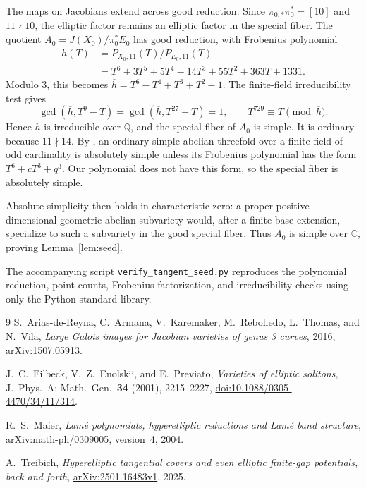 \documentclass[11pt]{amsart}
\theoremstyle{remark}
\newcommand{\Q}{\mathbb Q}
\newcommand{\CC}{\mathbb C}
\numberwithin{equation}{section}
\begin{document}
The maps on Jacobians extend across good reduction. Since
$\pi_{0,*}\pi_0^*=[10]$ and $11\nmid10$, the elliptic factor remains
an elliptic factor in the special fiber. The quotient
$A_0=J(X_0)/\pi_0^*E_0$ has good reduction, with Frobenius polynomial
\[
\begin{split}
h(T)&=P_{X_0,11}(T)/P_{E_0,11}(T)\\
&=T^6+3T^5+5T^4-14T^3+55T^2+363T+1331.
\end{split}
\]
Modulo $3$, this becomes
$\overline h=T^6-T^4+T^3+T^2-1$. The finite-field irreducibility test
gives
\[
\gcd(\overline h,T^9-T)=\gcd(\overline h,T^{27}-T)=1,
\qquad T^{729}\equiv T\pmod{\overline h}.
\]
Hence $h$ is irreducible over $\Q$, and the special fiber of $A_0$ is
simple. It is ordinary because $11\nmid14$. By
\cite[Proposition~3.4]{arias}, an ordinary simple abelian threefold
over a finite field of odd cardinality is absolutely simple unless
its Frobenius polynomial has the form $T^6+cT^3+q^3$. Our polynomial
does not have this form, so the special fiber is absolutely simple.

Absolute simplicity then holds in characteristic zero: a proper
positive-dimensional geometric abelian subvariety would, after a
finite base extension, specialize to such a subvariety in the good
special fiber. Thus $A_0$ is simple over $\CC$, proving
Lemma~\ref{lem:seed}.

The accompanying script \texttt{verify\_tangent\_seed.py} reproduces
the polynomial reduction, point counts, Frobenius factorization, and
irreducibility checks using only the Python standard library.

\begin{thebibliography}{9}
S.~Arias-de-Reyna, C.~Armana, V.~Karemaker, M.~Rebolledo,
L.~Thomas, and N.~Vila,
\emph{Large Galois images for Jacobian varieties of genus 3 curves},
2016, \href{https://arxiv.org/abs/1507.05913}{arXiv:1507.05913}.

J.~C.~Eilbeck, V.~Z.~Enolskii, and E.~Previato,
\emph{Varieties of elliptic solitons},
J.\ Phys.\ A: Math.\ Gen.\ \textbf{34} (2001), 2215--2227,
\href{https://doi.org/10.1088/0305-4470/34/11/314}{doi:10.1088/0305-4470/34/11/314}.

R.~S.~Maier,
\emph{Lam\'e polynomials, hyperelliptic reductions and Lam\'e band structure},
\href{https://arxiv.org/abs/math-ph/0309005}{arXiv:math-ph/0309005},
version~4, 2004.

A.~Treibich,
\emph{Hyperelliptic tangential covers and even elliptic finite-gap
potentials, back and forth},
\href{https://arxiv.org/abs/2501.16483v1}{arXiv:2501.16483v1}, 2025.
\end{thebibliography}
\end{document}
